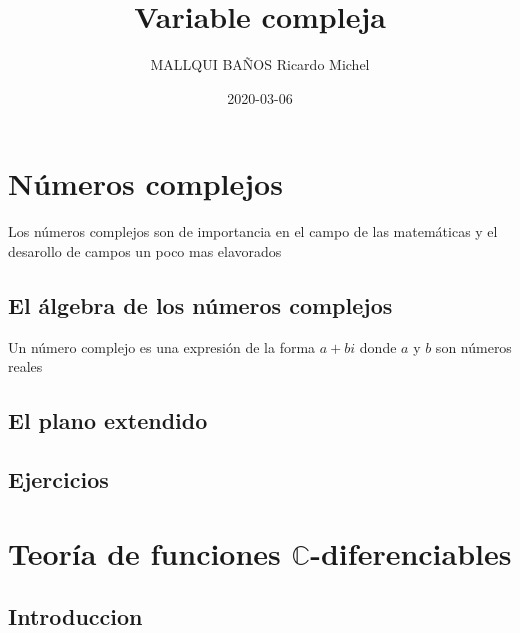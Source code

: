 \documentclass[]{book}
\title{Variable compleja}
\author{MALLQUI BAÑOS Ricardo Michel}
\date{2020-03-06}
\theoremstyle{definition}
\theoremstyle{definition}
\theoremstyle{definition}
\theoremstyle{remark}
\let\BeginKnitrBlock\begin \let\EndKnitrBlock\end
\begin{document}
\maketitle

{
\setcounter{tocdepth}{1}
\tableofcontents
}
\hypertarget{nuxfameros-complejos}{%
\chapter{Números complejos}\label{nuxfameros-complejos}}

Los números complejos son de importancia en el campo de las matemáticas y el desarollo de campos un poco mas elavorados

\hypertarget{el-uxe1lgebra-de-los-nuxfameros-complejos}{%
\section{El álgebra de los números complejos}\label{el-uxe1lgebra-de-los-nuxfameros-complejos}}

\BeginKnitrBlock{definition}[Número complejo]
\protect\hypertarget{def:unnamed-chunk-1}{}{\label{def:unnamed-chunk-1} \iffalse (Número complejo) \fi{} }Un número complejo es una expresión de la forma \(a+bi\) donde \(a\) y \(b\) son números reales
\EndKnitrBlock{definition}

\hypertarget{el-plano-extendido}{%
\section{El plano extendido}\label{el-plano-extendido}}

\hypertarget{ejercicios}{%
\section{Ejercicios}\label{ejercicios}}

\hypertarget{teoruxeda-de-funciones-mathbbc-diferenciables}{%
\chapter{\texorpdfstring{Teoría de funciones \(\mathbb{C}\)-diferenciables}{Teoría de funciones \textbackslash{}mathbb\{C\}-diferenciables}}\label{teoruxeda-de-funciones-mathbbc-diferenciables}}

\hypertarget{introduccion}{%
\section{Introduccion}\label{introduccion}}
\end{document}
